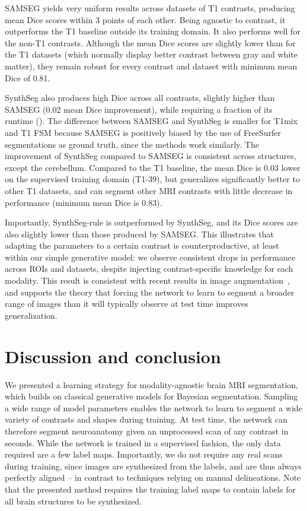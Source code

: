 \documentclass{midl}
\newcommand{\netname}{SynthSeg}
\begin{document}
SAMSEG yields very uniform results across datasets of T1 contrasts, producing mean Dice scores within 3 points of each other. Being agnostic to contrast, it outperforms the T1 baseline outside its training domain. It also performs well for the non-T1 contrasts. Although the mean Dice scores are slightly lower than for the T1 datasets (which normally display better contrast between gray and white matter), they remain robust for every contrast and dataset with minimum mean Dice of 0.81.

\netname{} also produces high Dice across all contrasts, slightly higher than SAMSEG (0.02 mean Dice improvement), while requiring a fraction of its runtime (). The difference between SAMSEG and \netname{} is smaller for T1mix and T1 FSM because SAMSEG is positively biased by the use of FreeSurfer segmentations as ground truth, since the methods work similarly. The improvement of \netname{} compared to SAMSEG is consistent across structures, except the cerebellum. Compared to the T1 baseline, the mean Dice is 0.03 lower on the supervised training domain (T1-39), but generalizes significantly better to other T1 datasets, and can segment other MRI contrasts with little decrease in performance (minimum mean Dice is 0.83).

Importantly, \netname{}-rule is outperformed by \netname{}, and its Dice scores are also slightly lower than those produced by SAMSEG. This illustrates that adapting the parameters to a certain contrast is counterproductive, at least within our simple generative model: we observe consistent drops in performance across ROIs and datasets, despite injecting contrast-specific knowledge for each modality. This result is consistent  with recent results in image augmentation~\cite{chaitanya_semi-supervised_2019}, and supports the theory that forcing the network to learn to segment a broader range of images than it will typically observe at test time improves generalization. 




\section{Discussion and conclusion}

We presented a learning strategy for modality-agnostic brain MRI segmentation, which builds on classical generative models for Bayesian segmentation. Sampling a wide range of model parameters enables the network to learn to segment a wide variety of contrasts and shapes during training. At test time, the network can therefore segment neuroanatomy given an unprocessed scan of any contrast in seconds. While the network is trained in a supervised fashion, the only data required are a few label maps. Importantly, we do not require any real scans during training, since images are synthesized from the labels, and are thus always perfectly aligned -- in contrast to techniques relying on manual delineations. Note that the presented method requires the training label maps to contain labels for all brain structures to be synthesized.
\end{document}
